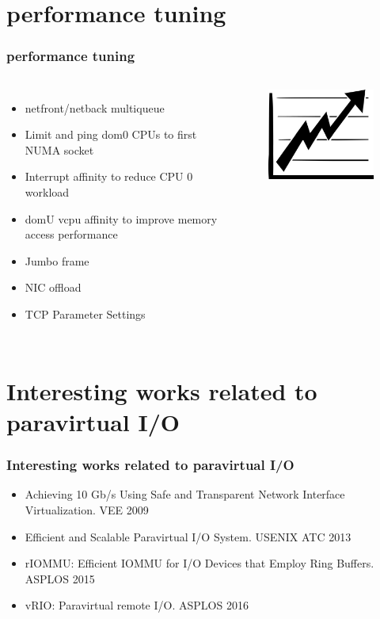 \documentclass[aspectratio=169]{beamer}
\begin{document}
\section{performance tuning}
\begin{frame}
\frametitle{performance tuning}
\begin{columns}[c]
\begin{itemize}
\item netfront/netback multiqueue
\item Limit and ping dom0 CPUs to first NUMA socket
\item Interrupt affinity to reduce CPU 0 workload
\item domU vcpu affinity to improve memory access performance
\item Jumbo frame
\item NIC offload
\item TCP Parameter Settings
\end{itemize}
\begin{center}
\begin{figure}
\includegraphics[width=.8\linewidth]{figures/performance.pdf}
\end{figure}
\end{center}
\end{columns}
\end{frame}


\section{Interesting works related to paravirtual I/O}
\begin{frame}
\frametitle{Interesting works related to paravirtual I/O}
\begin{itemize}
\item Achieving 10 Gb/s Using Safe and Transparent Network Interface Virtualization. VEE 2009
\item Efficient and Scalable Paravirtual I/O System. USENIX ATC 2013
\item rIOMMU: Efficient IOMMU for I/O Devices that Employ Ring Buffers. ASPLOS 2015
\item vRIO: Paravirtual remote I/O.  ASPLOS 2016
\end{itemize}
\end{frame}
\end{document}
